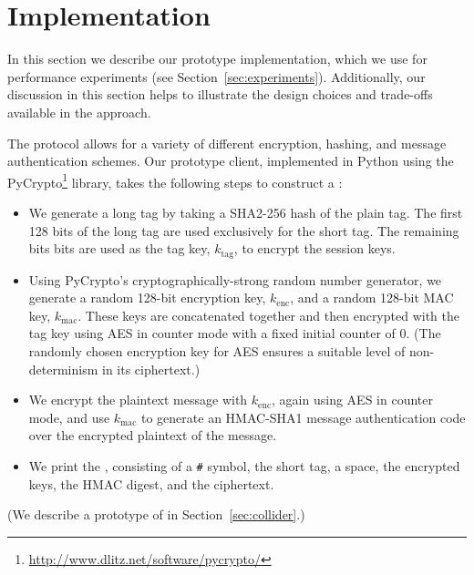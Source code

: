 \section{Implementation}
\label{sec:implementation}

In this section we describe our prototype \hoot implementation, which we
use for performance experiments (see
Section~\ref{sec:experiments}). Additionally, our discussion in this
section helps to illustrate the design choices and trade-offs available
in the \hoot approach.

The \hoot protocol allows for a variety of different encryption,
hashing, and message authentication schemes. Our prototype client,
implemented in Python using the
PyCrypto\footnote{\url{http://www.dlitz.net/software/pycrypto/}}
library, takes the following steps to construct a \msg:
\begin{itemize}
\item We generate a long tag by taking a SHA2-256 hash of the plain
  tag. The first 128 bits of the long tag are used exclusively for the
  short tag. The remaining bits
  bits are used as the tag key, $k_{\mathrm{tag}}$, to encrypt the
  session keys.
\item Using PyCrypto's cryptographically-strong random number
  generator, we generate 
  a random 128-bit encryption key, $k_{\mathrm{enc}}$, and a random 128-bit MAC key,
  $k_{\mathrm{mac}}$. These keys are
  concatenated together and then encrypted with the tag key using AES in
  counter mode with a fixed initial counter of $0$. (The randomly
  chosen encryption key for AES ensures a suitable level of
  non-determinism in its ciphertext.)
\item We encrypt the plaintext message with $k_{\mathrm{enc}}$, again using AES in
  counter mode, and use $k_{\mathrm{mac}}$ to generate an HMAC-SHA1
  message authentication code over the encrypted plaintext of the
  message.
\item We print the \msg, consisting of a {\tt \#} symbol, the short tag,
  a space, the encrypted keys, the HMAC digest, and the ciphertext.
\end{itemize}

(We describe a prototype of  in
Section~\ref{sec:collider}.)

